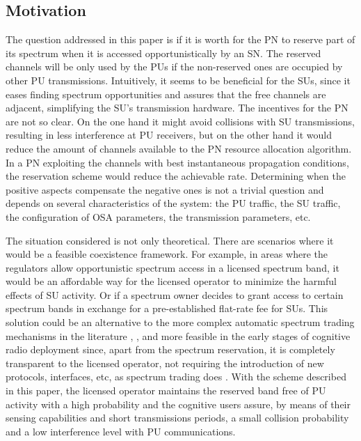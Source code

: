 \subsection{Motivation}
The question addressed in this paper is if it is worth for the PN to reserve part of its spectrum when it is accessed opportunistically by an SN. The reserved channels will be only used by the PUs if the non-reserved ones are occupied by other PU transmissions. 
Intuitively, it seems to be beneficial for the SUs, since it eases finding spectrum opportunities and assures that the free channels are adjacent, simplifying the SU's transmission hardware.
The incentives for the PN are not so clear. On the one hand it might avoid collisions with SU transmissions, resulting in less interference at PU receivers, but on the other hand it would reduce the amount of channels available to the PN resource allocation algorithm. In a PN exploiting the channels with best instantaneous propagation conditions, the reservation scheme would reduce the achievable rate.
Determining when the positive aspects compensate the negative ones is not a trivial question and depends on several characteristics of the system: the PU traffic, the SU traffic, the configuration of OSA parameters, the transmission parameters, etc.

The situation considered is not only theoretical. There are scenarios where it would be a feasible coexistence framework. For example, in areas where the regulators allow opportunistic spectrum access in a licensed spectrum band, it would be an affordable way for the licensed operator to minimize the harmful effects of SU activity. Or if a spectrum owner decides to grant access to certain spectrum bands in exchange for a pre-established flat-rate fee for SUs. This solution could be an alternative to the more complex automatic spectrum trading mechanisms in the literature \cite{ref:Gao2011}, \cite{ref:Yu2010}, and more feasible in the early stages of cognitive radio deployment since, apart from the spectrum reservation, it is completely transparent to the licensed operator, not requiring the introduction of new protocols, interfaces, etc, as spectrum trading does \cite{ref:Yang2011}. With the scheme described in this paper, the licensed operator maintains the reserved band free of PU activity with a high probability and the cognitive users assure, by means of their sensing capabilities and short transmissions periods, a small collision probability and a low interference level with PU communications.
 
